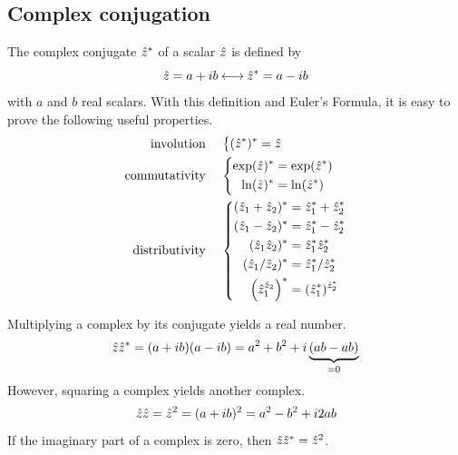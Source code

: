 
\subsection{Complex conjugation}
The complex conjugate $\hat{z}^*$ of a scalar $\hat{z}$ is defined by
\begin{equation}
    \hat{z} = a + ib \mathbin{\longleftrightarrow} \hat{z}^* = a - ib    \label{eq:conj_rect}
\end{equation}
with $a$ and $b$ real scalars.
With this definition and Euler's Formula, it is easy to prove the following useful properties.
\begin{subequations}
\begin{align}
    \text{involution     } \quad &
    \left\lbrace
        \begin{aligned}
            (\cp{z}^*)^* &= \cp{z}
        \end{aligned}
    \right.
    \\
    \text{commutativity } \quad &
    \left\lbrace
        \begin{aligned}
            \exp(\cp{z})^* &= \exp(\cp{z}^*) \\
            \ln (\cp{z})^* &= \ln (\cp{z}^*) \\
        \end{aligned}
    \right.
    \\
    \text{distributivity } \quad &
    \left\lbrace
        \begin{aligned}
            (\cp{z}_1 + \cp{z}_2)^* &= \cp{z}_1^* + \cp{z}_2^* \\
            (\cp{z}_1 - \cp{z}_2)^* &= \cp{z}_1^* - \cp{z}_2^* \\
            (\cp{z}_1   \cp{z}_2)^* &= \cp{z}_1^*   \cp{z}_2^* \\
            (\cp{z}_1 / \cp{z}_2)^* &= \cp{z}_1^* / \cp{z}_2^* \\
            \left(\cp{z}_1^{\cp{z}_2}\right)^* &= (\cp{z}_1^*)^{\cp{z}_2^*}
        \end{aligned}
    \right.
\end{align}
    \label{eq:conj_props}
\end{subequations}

Multiplying a complex by its conjugate yields a real number.
\begin{align}
    \hat{z}\hat{z}^* = (a + ib)(a - ib) = a^2 + b^2 + i\underbrace{(ab-ab)}_{=0}
\end{align}
However, squaring a complex yields another complex.
\begin{align}
    \hat{z}\hat{z} = \hat{z}^2 = (a + ib)^2 = a^2 - b^2 + i2ab
\end{align}
If the imaginary part of a complex is zero, then $\hat{z}\hat{z}^* = \hat{z}^2$.

